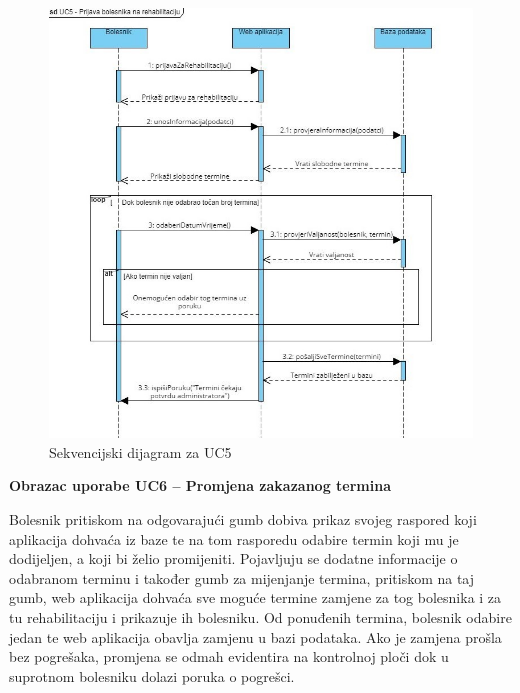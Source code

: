 \begin{figure}[h!]
    \centering
    \includegraphics[width=\textwidth]{./slike/Sekvencijski - UC5.jpg} 
    \caption{Sekvencijski dijagram za UC5}
    \label{fig:my_image}
\end{figure}
\eject


\textbf{Obrazac uporabe UC6 – Promjena zakazanog termina}

Bolesnik pritiskom na odgovarajući gumb dobiva prikaz svojeg raspored koji aplikacija dohvaća iz baze te na tom rasporedu odabire termin koji mu je dodijeljen, a koji bi želio promijeniti. Pojavljuju se dodatne informacije o odabranom terminu i također gumb za mijenjanje termina, pritiskom na taj gumb, web aplikacija dohvaća sve moguće termine zamjene za tog bolesnika i za tu rehabilitaciju i prikazuje ih bolesniku. Od ponuđenih termina, bolesnik odabire jedan te web aplikacija obavlja zamjenu u bazi podataka. Ako je zamjena prošla bez pogrešaka, promjena se odmah evidentira na kontrolnoj ploči dok u suprotnom bolesniku dolazi poruka o pogrešci.



